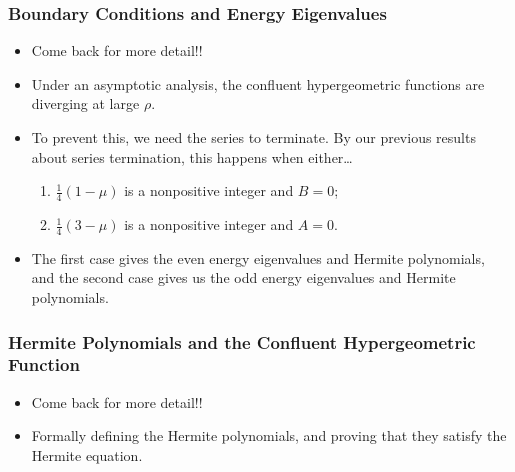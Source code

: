 \documentclass[../finalProject.tex]{subfiles}
\begin{document}
\subsubsection{Boundary Conditions and Energy Eigenvalues}
\begin{itemize}
    \item Come back for more detail!!
    \item Under an asymptotic analysis, the confluent hypergeometric functions are diverging at large $\rho$.
    \item To prevent this, we need the series to terminate. By our previous results about series termination, this happens when either\dots
    \begin{enumerate}
        \item $\frac{1}{4}(1-\mu)$ is a nonpositive integer and $B=0$;
        \item $\frac{1}{4}(3-\mu)$ is a nonpositive integer and $A=0$.
    \end{enumerate}
    \item The first case gives the even energy eigenvalues and Hermite polynomials, and the second case gives us the odd energy eigenvalues and Hermite polynomials.
\end{itemize}

\subsubsection{Hermite Polynomials and the Confluent Hypergeometric Function}
\begin{itemize}
    \item Come back for more detail!!
    \item Formally defining the Hermite polynomials, and proving that they satisfy the Hermite equation.
\end{itemize}
\end{document}
